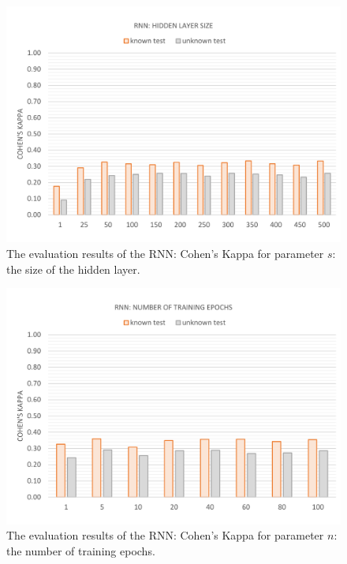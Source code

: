 \vspace{-13mm}
\begin{figure}[H]
	\centering\includegraphics[width=\textwidth]{images/evaluation_rnn_s_k}
	\caption[RNN Evaluation: Hidden Layer Size]{The evaluation results of the RNN: Cohen's Kappa for parameter $s$: the size of the hidden layer.}
	\label{f.evaluation.rnn.s.k}
\end{figure}

\vspace{-11mm}
\begin{figure}[H]
	\centering\includegraphics[width=\textwidth]{images/evaluation_rnn_n_k}
	\caption[RNN Evaluation: Number of Training Epochs]{The evaluation results of the RNN: Cohen's Kappa for parameter $n$: the number of training epochs.}
	\label{f.evaluation.rnn.n.k}
\end{figure}

